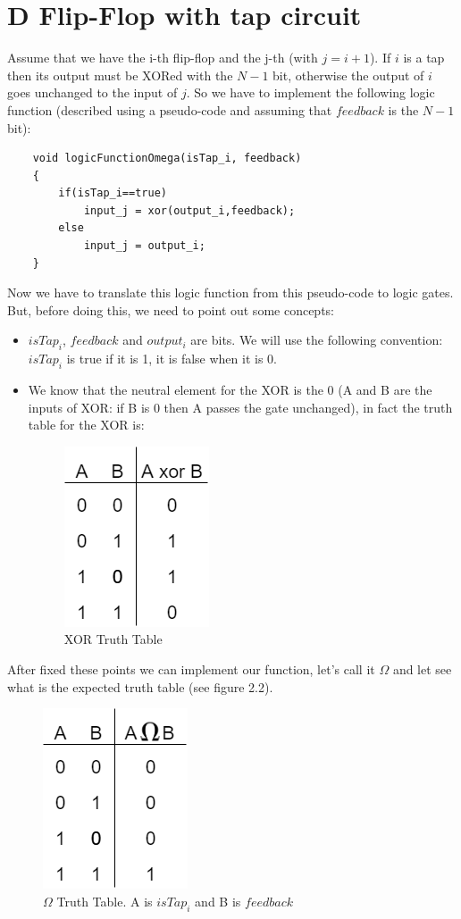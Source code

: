 \documentclass[a4paper]{report}
\begin{document}
\section{D Flip-Flop with tap circuit}
Assume that we have the i-th flip-flop and the j-th (with $j = i +1$). If $i$ is a tap then its output must be XORed with the $N-1$ bit, otherwise the output of $i$ goes unchanged to the input of $j$. So we have to implement the following logic function (described using a pseudo-code and assuming that $feedback$ is the $N-1$ bit):
\begin{lstlisting}
	void logicFunctionOmega(isTap_i, feedback)
	{
		if(isTap_i==true)
			input_j = xor(output_i,feedback);
		else
			input_j = output_i;
	}
\end{lstlisting}
Now we have to translate this logic function from this pseudo-code to logic gates.
But, before doing this, we need to point out some concepts:
\begin{itemize}
	\item $isTap_i$, $feedback$ and $output_i$ are bits. We will use the following convention: $isTap_i$ is true if it is 1, it is false when it is 0.
	\item We know that the neutral element for the XOR is the 0 (A and B are the inputs of XOR: if B is 0 then A passes the gate unchanged), in fact the truth table for the XOR is:
	\begin{figure}[htpb]
		\centering
		\includegraphics[scale=0.6]{img/XORtruthTable.png}
		\caption{XOR Truth Table}
	\end{figure} 
\end{itemize}

\noindent After fixed these points we can implement our function, let's call it $\Omega$ and let see what is the expected truth table (see figure 2.2).

\begin{figure}[htpb]
	\centering
	\includegraphics[scale=0.6]{img/ANDtruthTable.png}
	\caption{$\Omega$ Truth Table. A is $isTap_i$ and B is $feedback$}
\end{figure}
\end{document}
